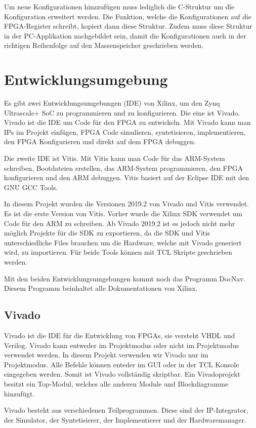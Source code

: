 \documentclass{article}
\begin{document}
Um neue Konfigurationen hinzzufügen muss lediglich die C-Struktur um dîe Konfiguration erweitert werden. Die Funktion, welche die Konfigurationen auf die FPGA-Register schreibt, kopiert dann diese Struktur. Zudem muss diese Struktur in der PC-Applikation nachgebildet sein, damit die Konfigurationen auch in der richtigen Reihenfolge auf den Massenspeicher geschrieben werden.

\section{Entwicklungsumgebung}
Es gibt zwei Entwicklungsumgebungen (IDE) von Xilinx, um den Zynq Ultrascale+ SoC zu programmieren und zu konfigurieren. Die eine ist Vivado. Vivado ist die IDE um Code für den FPGA zu entwickeln. Mit Vivado kann man IPs im Projekt einfügen, FPGA Code simulieren, syntetisieren, implementieren, den FPGA Konfigurieren und direkt auf dem FPGA debuggen.

Die zweite IDE ist Vitis. Mit Vitis kann man Code für das ARM-System schreiben, Bootdateien erstellen, das ARM-System programmieren, den FPGA konfigurieren und den ARM debuggen. Vitis basiert auf der Eclipse IDE mit den GNU GCC Tools.

In diesem Projekt wurden die Versionen 2019.2 von Vivado und Vitis verwendet. Es ist die erste Version von Vitis. Vorher wurde die Xilinx SDK verwendet um Code für den ARM zu schreiben. Ab Vivado 2019.2 ist es jedoch nicht mehr möglich Projekte für die SDK zu exportieren, da die SDK und Vitis unterschiedliche Files brauchen um die Hardware, welche mit Vivado generiert wird, zu importieren. Für beide Tools können mit TCL Skripte geschrieben werden.

Mit den beiden Entwicklungsumgebungen kommt noch das Programm DocNav. Diesem Programm beinhaltet alle Dokumentationen von Xilinx.
\subsection{Vivado}
Vivado ist die IDE für die Entwicklung von FPGAs, sie versteht VHDL und Verilog. Vivado kann entweder im Projektmodus oder nicht im Projektmodus verwendet werden. In diesem Projekt verwenden wir Vivado nur im Projektmodus. Alle Befehle können enteder im GUI oder in der TCL Konsole eingegeben werden. Somit ist Vivado vollständig skriptbar. Ein Vivadoprojekt besitzt ein Top-Modul, welches alle anderen Module und Blockdiagramme hinzufügt.

Vivado besteht aus verschiedenen Teilprogrammen. Diese sind der IP-Integrator, der Simulator, der Syntetisierer, der Implementierer und der Hardwaremanager.
\end{document}
